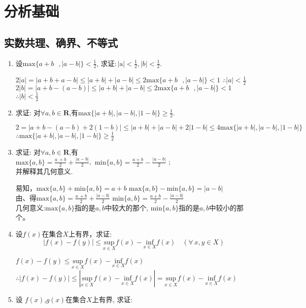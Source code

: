 \chapter{分析基础}
\section{实数共理、确界、不等式}
\begin{enumerate}
	\item 设$\mathrm{max}\{a+b\text{ },|a-b|\}<\tfrac{1}{2}$, 求证:\,$|\mathrm{a}|<\tfrac{1}{2},  |b|<\tfrac{1}{2}.$
	\begin{solution}
		$2|a|=|a+b+a-b|\le |a+b|+|a-b|\le 2\mathrm{max}\{a+b\text{ },|a-b|\}<1$ $\therefore|a|<\tfrac{1}{2}$\\
		$2|b|=|a+b-(a-b)|\le |a+b|+|a-b|\le 2\mathrm{max}\{a+b\text{ },|a-b|\}<1$ $\therefore|b|<\tfrac{1}{2}$                         
	\end{solution}
	\item 求证: 对$\mathbf{\forall}a,b\in \boldsymbol{R}$,有$\mathrm{max}\{ |a+b| ,|a-b| , |1-b| \} \ge \tfrac{1}{2}$.
	\begin{solution}
		$2 = |a+b-(a-b)+2(1-b)|\le |a+b|+|a-b|+2|1-b|\le 4\mathrm{max}\{|a+b|,|a-b|,|1-b|\} $ \\
		$\therefore \mathrm{max}\{|a+b|,|a-b|,|1-b|\}\ge \tfrac{1}{2} $
	\end{solution}
	\item 求证: 对$\forall a,b\in \boldsymbol{R}$,有\\
	$\mathrm{max} \{a,b\} = \tfrac{a\,+b}{2}+\tfrac{|a - b|}{2}$,\ $\mathrm{min} \{a,b\} = \tfrac{a+b}{2}-\tfrac{|a-b|}{2}$ ;\\
	并解释其几何意义.
	\begin{solution}
	易知，$\mathrm{max}\{a,b\}+\mathrm{min}\{a,b\}=a+b$ \quad $\mathrm{max}\{a,b\}-\mathrm{min}\{a,b\}=|a-b|$\\
	由、得$\mathrm{max} \{a,b\} = \tfrac{a\,+b}{2}+\tfrac{|a - b|}{2}$\quad
	$\mathrm{min} \{a,b\} = \tfrac{a+b}{2}-\tfrac{|a-b|}{2}$\\
	几何意义:$\mathrm{max}\{a,b\}$指的是$a,b$中较大的那个, $\mathrm{min}\{a,b\}$指的是$a,b$中较小的那个。
	\end{solution}
	\item 设$f\left( x \right) $在集合$X$上有界，求证:
	$$
	|f\left( x \right)-f\left( y\right)  | \le \underset{x\in X}{\mathrm{sup}}f\left( x\right)  -\underset{x\in X}{\mathrm{inf}}f\left( x \right)\quad (\forall\,x, y \in X)
	$$ 
	\begin{solution}
			$f(x)-f(y) \le \underset{x \in X}{\mathrm{sup}}f(x) - \underset{x \in X}{\mathrm{inf}}f(x)$ $\therefore |f(x)-f(y)| \le |\underset{x \in X}{\mathrm{sup}}f(x) - \underset{x \in X}{\mathrm{inf}}f(x)|=\underset{x \in X}{\mathrm{sup}}f(x) - \underset{x \in X}{\mathrm{inf}}f(x)$
	\end{solution}
	\item 设 $f(x)$,$g(x)$在集合$X$上有界, 求证:\\
	

\end{enumerate}
